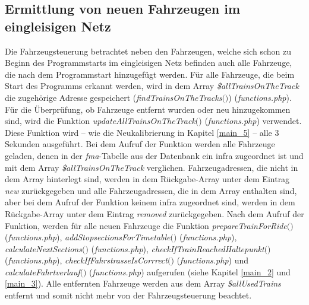 \subsection{Ermittlung von neuen Fahrzeugen im eingleisigen Netz} \label{main_6}
Die Fahrzeugsteuerung betrachtet neben den Fahrzeugen, welche sich schon zu Beginn des Programmstarts im eingleisigen Netz befinden auch alle Fahrzeuge, die nach dem Programmstart hinzugefügt werden. Für alle Fahrzeuge, die beim Start des Programms erkannt werden, wird in dem Array \textit{\$allTrainsOnTheTrack} die zugehörige Adresse gespeichert (\textit{find\-Trains\-On\-The\-Tracks$($$)$}) (\textit{functions.php}). Für die Überprüfung, ob Fahrzeuge entfernt wurden oder neu hinzugekommen sind, wird die Funktion \textit{up\-date\-All\-Trains\-On\-The\-Track$($$)$} (\textit{functions.php}) verwendet. Diese Funktion wird -- wie die Neukalibrierung in Kapitel \ref{main_5} -- alle 3 Sekunden ausgeführt. Bei dem Aufruf der Funktion werden alle Fahrzeuge geladen, denen in der \textit{fma}-Tabelle aus der Datenbank ein \ac{infra} zugeordnet ist und mit dem Array \textit{\$allTrainsOnTheTrack} verglichen. Fahrzeugadressen, die nicht in dem Array hinterlegt sind, werden in dem Rückgabe-Array unter dem Eintrag \textit{new} zurückgegeben und alle Fahrzeugadressen, die in dem Array enthalten sind, aber bei dem Aufruf der Funktion keinem \ac{infra} zugeordnet sind, werden in dem Rückgabe-Array unter dem Eintrag \textit{removed} zurückgegeben. Nach dem Aufruf der Funktion, werden für alle neuen Fahrzeuge die Funktion \textit{pre\-pare\-Train\-For\-Ride$($$)$} (\textit{func\-tions.php}), \textit{add\-Stop\-sec\-tions\-For\-Time\-table$($$)$} (\textit{func\-tions.php}), \textit{cal\-culate\-Next\-Sec\-tions$($$)$} (\textit{func\-tions.php}), \textit{check\-If\-Train\-Reached\-Halte\-punkt$($$)$} (\textit{func\-tions.php}), \textit{check\-If\-Fahr\-strasse\-Is\-Corrrect$($$)$} (\textit{func\-tions.php}) und \textit{calculate\-Fahrt\-ver\-lauf$($$)$} (\textit{func\-tions\-.php}) aufgerufen (siehe Kapitel \ref{main_2} und \ref{main_3}). Alle entfernten Fahrzeuge werden aus dem Array \textit{\$allUsedTrains} entfernt und somit nicht mehr von der Fahrzeugsteuerung beachtet. 
